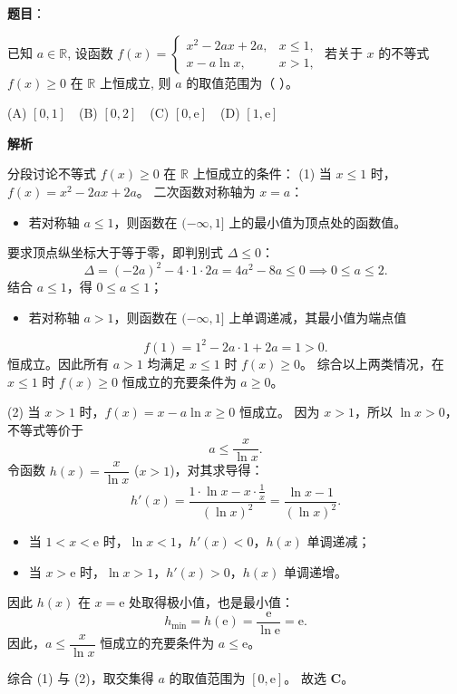 \begin{answer}

\textbf{题目}：

已知 $a \in \mathbb{R}$, 设函数 $f(x) = \begin{cases} x^2 - 2ax + 2a, & x \leqslant 1, \\ x - a \ln x, & x > 1, \end{cases}$ 若关于 $x$ 的不等式 $f(x) \geqslant 0$ 在 $\mathbb{R}$ 上恒成立, 则 $a$ 的取值范围为（ ）。

(A) $[0, 1]$　(B) $[0, 2]$　(C) $[0, \mathrm{e}]$　(D) $[1, \mathrm{e}]$

\textbf{解析}

分段讨论不等式 $f(x) \geqslant 0$ 在 $\mathbb{R}$ 上恒成立的条件：
(1) 当 $x \leqslant 1$ 时，$f(x) = x^2 - 2ax + 2a$。
二次函数对称轴为 $x = a$：
\begin{itemize}
\item 若对称轴 $a \leqslant 1$，则函数在 $(-\infty, 1]$ 上的最小值为顶点处的函数值。
\end{itemize}
  要求顶点纵坐标大于等于零，即判别式 $\Delta \leqslant 0$：
\nopagebreak[4]
\[\Delta = (-2a)^2 - 4 \cdot 1 \cdot 2a = 4a^2 - 8a \leqslant 0 \implies 0 \leqslant a \leqslant 2.\]
  结合 $a \leqslant 1$，得 $0 \leqslant a \leqslant 1$；
\begin{itemize}
\item 若对称轴 $a > 1$，则函数在 $(-\infty, 1]$ 上单调递减，其最小值为端点值
\end{itemize}
\nopagebreak[4]
\[f(1) = 1^2 - 2a \cdot 1 + 2a = 1 > 0.\]
  恒成立。因此所有 $a > 1$ 均满足 $x \leqslant 1$ 时 $f(x) \geqslant 0$。
综合以上两类情况，在 $x \leqslant 1$ 时 $f(x) \geqslant 0$ 恒成立的充要条件为 $a \geqslant 0$。

(2) 当 $x > 1$ 时，$f(x) = x - a \ln x \geqslant 0$ 恒成立。
因为 $x > 1$，所以 $\ln x > 0$，不等式等价于
\nopagebreak[4]
\[a \leqslant \frac{x}{\ln x}.\]
令函数 $h(x) = \dfrac{x}{\ln x}$ ($x > 1$)，对其求导得：
\nopagebreak[4]
\[h'(x) = \frac{1 \cdot \ln x - x \cdot \frac{1}{x}}{(\ln x)^2} = \frac{\ln x - 1}{(\ln x)^2}.\]
\begin{itemize}
\item 当 $1 < x < \mathrm{e}$ 时，$\ln x < 1$，$h'(x) < 0$，$h(x)$ 单调递减；
\item 当 $x > \mathrm{e}$ 时，$\ln x > 1$，$h'(x) > 0$，$h(x)$ 单调递增。
\end{itemize}
因此 $h(x)$ 在 $x = \mathrm{e}$ 处取得极小值，也是最小值：
\nopagebreak[4]
\[h_{\min} = h(\mathrm{e}) = \frac{\mathrm{e}}{\ln \mathrm{e}} = \mathrm{e}.\]
因此，$a \leqslant \dfrac{x}{\ln x}$ 恒成立的充要条件为 $a \leqslant \mathrm{e}$。

综合 (1) 与 (2)，取交集得 $a$ 的取值范围为 $[0, \mathrm{e}]$。
故选 \textbf{C}。


\par\medskip

\end{answer}

